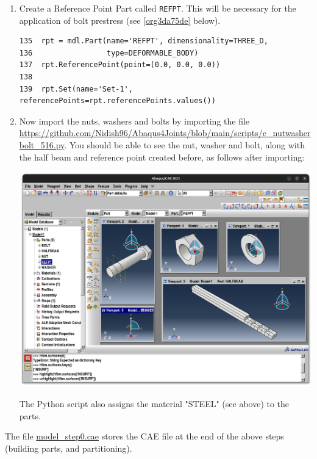 \documentclass[11pt]{article}
\begin{document}
\begin{enumerate}
\item Create a Reference Point Part called \texttt{REFPT}.
This will be necessary for the application of bolt prestress (see \ref{org3da75de} below).
\begin{verbatim}
135  rpt = mdl.Part(name='REFPT', dimensionality=THREE_D, 
136                 type=DEFORMABLE_BODY)
137  rpt.ReferencePoint(point=(0.0, 0.0, 0.0))
138  
139  rpt.Set(name='Set-1', referencePoints=rpt.referencePoints.values())
\end{verbatim}
\item Now import the nuts, washers and bolts by importing the file \url{https://github.com/Nidish96/Abaqus4Joints/blob/main/scripts/c\_nutwasherbolt\_516.py}.
You should be able to see the nut, washer and bolt, along with the half beam and reference point created before, as follows after importing:
\begin{center}
\includegraphics[width=.9\linewidth]{./figs/nwb.png}
\end{center}
The Python script also assigns the material "STEEL" (see above) to the parts.
\end{enumerate}

The file \href{https://github.com/Nidish96/Abaqus4Joints/blob/main/assets/assembly/model\_step0.cae}{model\_step0.cae} stores the CAE file at the end of the above steps (building parts, and partitioning).
\end{document}
